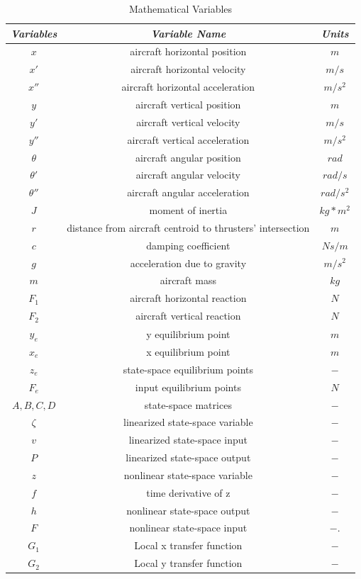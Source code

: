 \documentclass[conference]{IEEEtran}
\begin{document}
\begin{table}[htbp]
\begin{center}
\caption{Mathematical Variables}
\begin{tabular}{|c|c|c|}
\hline
\textbf{\textit{Variables}}& \textbf{\textit{Variable Name}}& \textbf{\textit{Units}} \\
\hline
$x$ & aircraft horizontal position & $m$ \\
\hline
$x'$ & aircraft horizontal velocity & $m/s$ \\
\hline
$x''$ & aircraft horizontal acceleration & $m/s^2$ \\
\hline
$y$ & aircraft vertical position & $m$ \\
\hline
$y'$ & aircraft vertical velocity & $m/s$ \\
\hline
$y''$ & aircraft vertical acceleration & $m/s^2$ \\
\hline
$\theta$ & aircraft angular position & $rad$ \\
\hline
$\theta'$ & aircraft angular velocity & $rad/s$ \\
\hline
$\theta''$ & aircraft  angular acceleration & $rad/s^2$ \\
\hline
$J$ & moment of inertia & $kg*m^2$ \\
\hline
$r$ & distance from aircraft centroid to thrusters' intersection& $m$ \\
\hline
$c$ & damping coefficient & $Ns/m$ \\
\hline
$g$ & acceleration due to gravity  & $m/s^2$ \\
\hline
$m$ & aircraft mass & $kg$ \\
\hline
$F_1$ & aircraft horizontal reaction & $N$ \\
\hline
$F_2$ & aircraft vertical reaction & $N$ \\
\hline
$y_e$ & y equilibrium point & $m$ \\
\hline
$x_e$ & x equilibrium point & $m$ \\
\hline
$z_e$ & state-space equilibrium points & $-$ \\
\hline
$F_e$ & input equilibrium points & $N$ \\
\hline
$A,B,C,D$ & state-space matrices & $-$ \\
\hline
$\zeta$ & linearized state-space variable & $-$\\
\hline
$v$ & linearized state-space input & $-$\\
\hline
$P$ & linearized state-space output & $-$\\
\hline
$z$ & nonlinear state-space variable & $-$\\
\hline
$f$ & time derivative of z & $-$\\
\hline
$h$ & nonlinear state-space output & $-$\\
\hline
$F$ & nonlinear state-space input & $-$.\\
\hline
$G_1$ & Local x transfer function & $-$\\
\hline
$G_2$ & Local y transfer function & $-$\\
\hline
\end{tabular}
\end{center}
\end{table}
\end{document}

